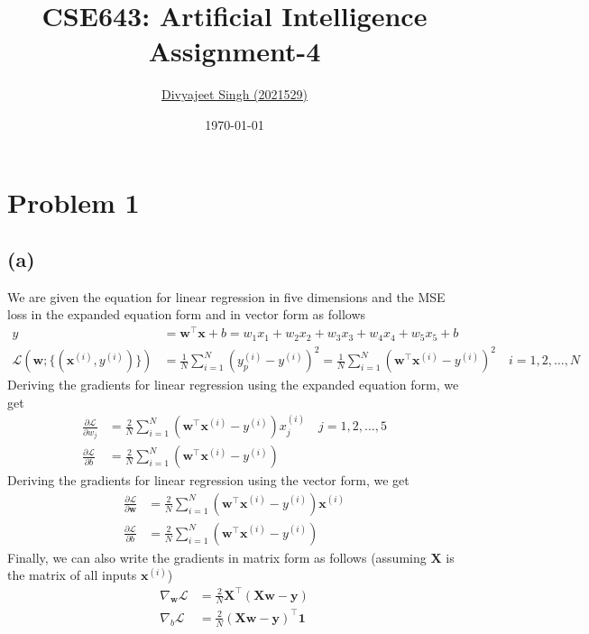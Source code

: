 \documentclass[12pt]{article}
\title{
    \textbf{CSE643: Artificial Intelligence} \\ \vspace*{-5pt}
    \textbf{\large{Assignment-4}}
}
\author{\href{mailto:divyajeet21529@iiitd.ac.in}{Divyajeet Singh (2021529)}}
\date{\today}
\begin{document}
    \maketitle

    \section*{Problem 1}
    \subsection*{(a)}
    We are given the equation for linear regression in five dimensions and the MSE loss
    in the expanded equation form and in vector form as follows
    \begin{align}
        y &= \mathbf{w}^{\top} \mathbf{x} + b = w_{1} x_{1} + w_{2} x_{2} + w_{3} x_{3} + w_{4} x_{4} + w_{5} x_{5} + b \\
        \mathcal{L}(\mathbf{w}; \{ (\mathbf{x}^{(i)}, y^{(i)}) \}) &= \frac{1}{N} \sum_{i=1}^{N} (y_{p}^{(i)} - y^{(i)})^{2}
        = \frac{1}{N} \sum_{i=1}^{N} \left( \mathbf{w}^{\top} \mathbf{x}^{(i)} - y^{(i)} \right)^{2} \quad i = 1, 2, \ldots, N
    \end{align}
    Deriving the gradients for linear regression using the expanded equation form, we get
    \begin{align}
        \frac{\partial \mathcal{L}}{\partial w_{j}} &= \frac{2}{N} \sum_{i=1}^{N} \left( \mathbf{w}^{\top} \mathbf{x}^{(i)} - y^{(i)} \right) x_{j}^{(i)} \quad j = 1, 2, \ldots, 5 \\
        \frac{\partial \mathcal{L}}{\partial b} &= \frac{2}{N} \sum_{i=1}^{N} \left( \mathbf{w}^{\top} \mathbf{x}^{(i)} - y^{(i)} \right)
    \end{align}
    Deriving the gradients for linear regression using the vector form, we get
    \begin{align}
        \frac{\partial \mathcal{L}}{\partial \mathbf{w}} &= \frac{2}{N} \sum_{i=1}^{N} \left( \mathbf{w}^{\top} \mathbf{x}^{(i)} - y^{(i)} \right) \mathbf{x}^{(i)} \\
        \frac{\partial \mathcal{L}}{\partial b} &= \frac{2}{N} \sum_{i=1}^{N} \left( \mathbf{w}^{\top} \mathbf{x}^{(i)} - y^{(i)} \right)
    \end{align}
    Finally, we can also write the gradients in matrix form as follows (assuming $\mathbf{X}$ is the matrix of all inputs $\mathbf{x}^{(i)}$)
    \begin{align}
        \nabla_{\mathbf{w}} \mathcal{L} &= \frac{2}{N} \mathbf{X}^{\top} \left( \mathbf{X} \mathbf{w} - \mathbf{y} \right) \\
        \nabla_{b} \mathcal{L} &= \frac{2}{N} \left( \mathbf{X} \mathbf{w} - \mathbf{y} \right)^{\top} \mathbf{1}
    \end{align}
\end{document}
